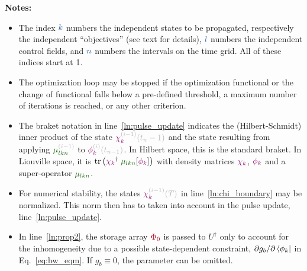 \documentclass[aps,pra,twocolumn,notitlepage,letterpaper]{revtex4}
\newcommand{\tr}[0]{\operatorname{tr}}
\newcommand{\VarScalar}[1]{{\color{clVarScalar}#1}}
\newcommand{\VarState}[1]{\ensuremath{\textcolor{clVarState}{#1}}}
\newcommand{\PropAnnotation}[1]{\textcolor{black!30}{#1}}
\newcommand{\VarPropState}[4]{\ensuremath{\VarState{#1}_{\textcolor{clVarState}{#2}}^{\PropAnnotation{#3}}\PropAnnotation{(#4)}}}  %
\newcommand{\VarOperator}[2]{{\color{clVarOperator}#1_{#2}}} %
\newcommand{\VarArray}[1]{{\color{clVarArray}#1}}
\begin{document}
\vspace{5pt} \textbf{Notes:}
  \begin{itemize}
    \item The index $\VarScalar{k}$ numbers the independent states to be
      propagated, respectively the independent ``objectives'' (see text for
      details), $\VarScalar{l}$ numbers the independent control fields, and
      $\VarScalar{n}$ numbers the intervals on the time grid. All of these
      indices start at 1.
    \item The optimization loop may be stopped if the optimization functional or
      the change of functional falls below a pre-defined threshold, a maximum
      number of iterations is reached, or any other criterion.
    \item The braket notation in line~\ref{ln:pulse_update} indicates the
      (Hilbert-Schmidt) inner product of the state
      $\VarPropState{\chi}{k}{(i-1)}{t_n-1}$ and the state
      resulting from applying $\VarOperator{\mu^{\PropAnnotation{(i-1)}}}{lkn}$
      to $\VarPropState{\phi}{k}{(i)}{t_{n-1}}$.
      In Hilbert space, this is the standard braket.
      In Liouville space, it is $\tr\left(\VarState{\chi_k}^\dagger
      \;\VarOperator{\mu}{lkn}[\VarState{\phi_k}]\right)$ with density
      matrices $\VarState{\chi_k}$, $\VarState{\phi_k}$ and a super-operator
      $\VarOperator{\mu}{lkn}$.
    \item For numerical stability, the states $\VarPropState{\chi}{k}{(i-1)}{T}$
      in line~\ref{ln:chi_boundary} may be normalized. This norm then has to
      taken into account in the pulse update, line~\ref{ln:pulse_update}.
    \item In line~\ref{ln:prop2}, the storage array $\VarArray{\Phi_0}$ is
      passed to $U^\dagger$ only to account for the inhomogeneity due to
      a possible state-dependent constraint, $\partial g_b / \partial
      \bra{\phi_k}$ in Eq.~\eqref{eq:bw_eqm}.
      If $g_b \equiv 0$, the parameter can be omitted.
  \end{itemize}


\end{document}
